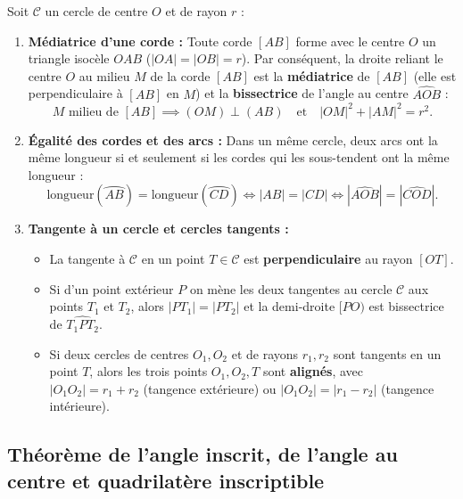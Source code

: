 \begin{theoreme}
Soit $\mathcal{C}$ un cercle de centre $O$ et de rayon $r$ :
\begin{enumerate}
    \item \textbf{Médiatrice d'une corde :} Toute corde $[AB]$ forme avec le centre $O$ un triangle isocèle $OAB$ ($|OA| = |OB| = r$). Par conséquent, la droite reliant le centre $O$ au milieu $M$ de la corde $[AB]$ est la \textbf{médiatrice} de $[AB]$ (elle est perpendiculaire à $[AB]$ en $M$) et la \textbf{bissectrice} de l'angle au centre $\widehat{AOB}$ :
    \[
        M \text{ milieu de } [AB] \implies (OM) \perp (AB) \quad \text{et} \quad |OM|^2 + |AM|^2 = r^2.
    \]
    \item \textbf{Égalité des cordes et des arcs :} Dans un même cercle, deux arcs ont la même longueur si et seulement si les cordes qui les sous-tendent ont la même longueur :
    \[
        \text{longueur}(\wideparen{AB}) = \text{longueur}(\wideparen{CD}) \iff |AB| = |CD| \iff |\widehat{AOB}| = |\widehat{COD}|.
    \]
    \item \textbf{Tangente à un cercle et cercles tangents :}
    \begin{itemize}
        \item La tangente à $\mathcal{C}$ en un point $T \in \mathcal{C}$ est \textbf{perpendiculaire} au rayon $[OT]$.
        \item Si d'un point extérieur $P$ on mène les deux tangentes au cercle $\mathcal{C}$ aux points $T_1$ et $T_2$, alors $|PT_1| = |PT_2|$ et la demi-droite $[PO)$ est bissectrice de $\widehat{T_1 P T_2}$.
        \item Si deux cercles de centres $O_1, O_2$ et de rayons $r_1, r_2$ sont tangents en un point $T$, alors les trois points $O_1, O_2, T$ sont \textbf{alignés}, avec $|O_1 O_2| = r_1 + r_2$ (tangence extérieure) ou $|O_1 O_2| = |r_1 - r_2|$ (tangence intérieure).
    \end{itemize}
\end{enumerate}
\end{theoreme}

\subsection{Théorème de l'angle inscrit, de l'angle au centre et quadrilatère inscriptible}

